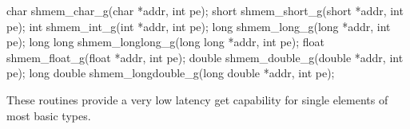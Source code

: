 \synC   %

char shmem_char_g(char *addr, int pe);
short shmem_short_g(short *addr, int pe);
int shmem_int_g(int *addr, int pe);
long shmem_long_g(long *addr, int pe);
long long  shmem_longlong_g(long long *addr, int pe);
float shmem_float_g(float *addr, int pe);
double shmem_double_g(double *addr, int pe);
long double shmem_longdouble_g(long double *addr, int pe); %

{
  These routines provide a very low latency get capability for single elements of most basic types. 
}
{
}
\eAPI

       
       
       
       





